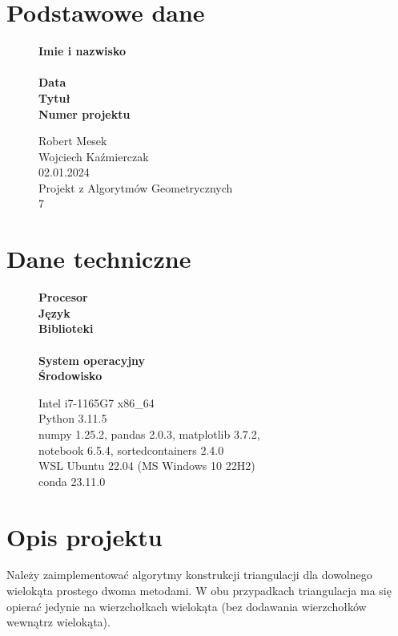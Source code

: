 \documentclass[12pt]{article}
\begin{document}
\section*{Podstawowe dane}
\begin{figure}[htp]
	\begin{minipage}[t]{0.3\textwidth}
		\textbf{Imie i nazwisko} \\
		\\
		\textbf{Data} \\
		\textbf{Tytuł} \\
		\textbf{Numer projektu}
	\end{minipage}%
	\begin{minipage}[t]{0.7\textwidth}
				Robert Mesek \\
		Wojciech Kaźmierczak \\
		02.01.2024 \\
		Projekt z Algorytmów Geometrycznych \\
		7
	\end{minipage}%
\end{figure}

\section*{Dane techniczne}
\begin{figure}[htp]
	\begin{minipage}[t]{0.3\textwidth}
		\textbf{Procesor} \\
		\textbf{Język} \\
		\textbf{Biblioteki} \\
		\\
		\textbf{System operacyjny} \\
		\textbf{Środowisko}

	\end{minipage}%
	\begin{minipage}[t]{0.7\textwidth}
		Intel i7-1165G7 x86\_64 \\
		Python 3.11.5 \\
		numpy 1.25.2, pandas 2.0.3, matplotlib 3.7.2, \\
		notebook 6.5.4, sortedcontainers 2.4.0 \\
		WSL Ubuntu 22.04 (MS Windows 10 22H2) \\
		conda 23.11.0
	\end{minipage}%
\end{figure}

\section*{Opis projektu}
Należy zaimplementować algorytmy konstrukcji triangulacji dla dowolnego wielokąta prostego dwoma metodami.
W obu przypadkach triangulacja ma się opierać jedynie na wierzchołkach wielokąta (bez dodawania wierzchołków wewnątrz wielokąta).
\end{document}
